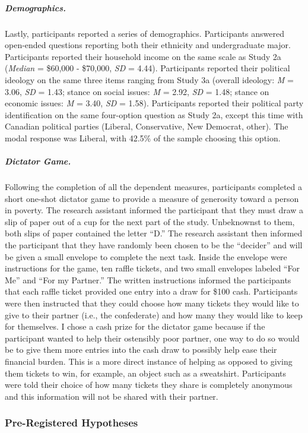 \documentclass{sfuthesis}
\begin{document}
\subparagraph{Demographics.} Lastly, participants reported a series of demographics. Participants answered open-ended questions reporting both their ethnicity and undergraduate major. Participants reported their household income on the same scale as Study 2a (\textit{Median} = \$60,000 - \$70,000, \textit{SD} = 4.44). Participants reported their political ideology on the same three items ranging from Study 3a (overall ideology: \textit{M} = 3.06, \textit{SD} = 1.43; stance on social issues: \textit{M} = 2.92, \textit{SD} = 1.48; stance on economic issues: \textit{M} = 3.40, \textit{SD} = 1.58). Participants reported their political party identification on the same four-option question as Study 2a, except this time with Canadian political parties (Liberal, Conservative, New Democrat, other). The modal response was Liberal, with 42.5\% of the sample choosing this option.

\subparagraph{Dictator Game.} Following the completion of all the dependent measures, participants completed a short one-shot dictator game to provide a measure of generosity toward a person in poverty. The research assistant informed the participant that they must draw a slip of paper out of a cup for the next part of the study. Unbeknownst to them, both slips of paper contained the letter “D.” The research assistant then informed the participant that they have randomly been chosen to be the “decider” and will be given a small envelope to complete the next task. Inside the envelope were instructions for the game, ten raffle tickets, and two small envelopes labeled “For Me” and “For my Partner.” The written instructions informed the participants that each raffle ticket provided one entry into a draw for \$100 cash. Participants were then instructed that they could choose how many tickets they would like to give to their partner (i.e., the confederate) and how many they would like to keep for themselves. I chose a cash prize for the dictator game because if the participant wanted to help their ostensibly poor partner, one way to do so would be to give them more entries into the cash draw to possibly help ease their financial burden. This is a more direct instance of helping as opposed to giving them tickets to win, for example, an object such as a sweatshirt. Participants were told their choice of how many tickets they share is completely anonymous and this information will not be shared with their partner.

\subsubsection{Pre-Registered Hypotheses}
\end{document}
